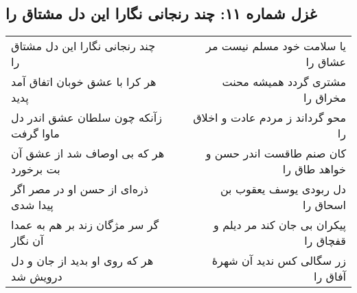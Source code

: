 \begin{center}
\section*{غزل شماره ۱۱: چند رنجانی نگارا این دل مشتاق را}
\label{sec:011}
\begin{longtable}{l p{0.5cm} r}
چند رنجانی نگارا این دل مشتاق را
&&
یا سلامت خود مسلم نیست مر عشاق را
\\
هر کرا با عشق خوبان اتفاق آمد پدید
&&
مشتری گردد همیشه محنت مخراق را
\\
زآنکه چون سلطان عشق اندر دل ماوا گرفت
&&
محو گرداند ز مردم عادت و اخلاق را
\\
هر که بی اوصاف شد از عشق آن بت برخورد
&&
کان صنم طاقست اندر حسن و خواهد طاق را
\\
ذره‌ای از حسن او در مصر اگر پیدا شدی
&&
دل ربودی یوسف یعقوب بن اسحاق را
\\
گر سر مژگان زند بر هم به عمدا آن نگار
&&
پیکران بی جان کند مر دیلم و قفچاق را
\\
هر که روی او بدید از جان و دل درویش شد
&&
زر سگالی کس ندید آن شهرهٔ آفاق را
\\
\end{longtable}
\end{center}
